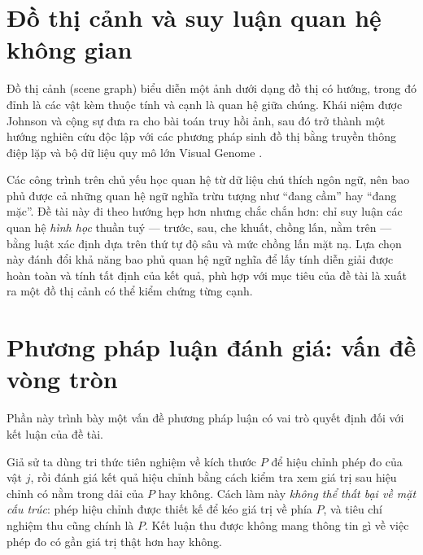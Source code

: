 
\section{Đồ thị cảnh và suy luận quan hệ không gian}

Đồ thị cảnh (scene graph) biểu diễn một ảnh dưới dạng đồ thị có hướng, trong đó đỉnh là các vật
kèm thuộc tính và cạnh là quan hệ giữa chúng. Khái niệm được Johnson và cộng sự
\cite{johnson2015scenegraph} đưa ra cho bài toán truy hồi ảnh, sau đó trở thành một hướng nghiên
cứu độc lập với các phương pháp sinh đồ thị bằng truyền thông điệp lặp \cite{xu2017scenegraph}
và bộ dữ liệu quy mô lớn Visual Genome \cite{krishna2017visualgenome}.

Các công trình trên chủ yếu học quan hệ từ dữ liệu chú thích ngôn ngữ, nên bao phủ được cả những
quan hệ ngữ nghĩa trừu tượng như ``đang cầm'' hay ``đang mặc''. Đề tài này đi theo hướng hẹp hơn
nhưng chắc chắn hơn: chỉ suy luận các quan hệ \emph{hình học} thuần tuý --- trước, sau, che
khuất, chồng lấn, nằm trên --- bằng luật xác định dựa trên thứ tự độ sâu và mức chồng lấn mặt
nạ. Lựa chọn này đánh đổi khả năng bao phủ quan hệ ngữ nghĩa để lấy tính diễn giải được hoàn toàn và tính tất định của kết quả, phù hợp với mục tiêu của đề tài là xuất ra một đồ thị cảnh có thể kiểm chứng từng cạnh.

\section{Phương pháp luận đánh giá: vấn đề vòng tròn}
\label{sec:vongtron}

Phần này trình bày một vấn đề phương pháp luận có vai trò quyết định đối với kết luận của đề
tài.

Giả sử ta dùng tri thức tiên nghiệm về kích thước $P$ để hiệu chỉnh phép đo của vật $j$, rồi
đánh giá kết quả hiệu chỉnh bằng cách kiểm tra xem giá trị sau hiệu chỉnh có nằm trong dải của
$P$ hay không. Cách làm này \emph{không thể thất bại về mặt cấu trúc}: phép hiệu chỉnh được
thiết kế để kéo giá trị về phía $P$, và tiêu chí nghiệm thu cũng chính là $P$. Kết luận thu được
không mang thông tin gì về việc phép đo có gần giá trị thật hơn hay không.

